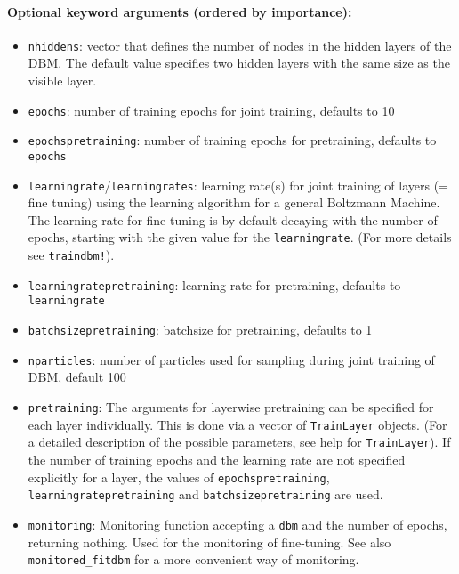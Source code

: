 \paragraph*{Optional keyword arguments (ordered by importance):}
\begin{itemize}
\item \texttt{nhiddens}: vector that defines the number of nodes in the hidden layers of  the DBM. The default value specifies two hidden layers with the same size  as the visible layer.


\item \texttt{epochs}: number of training epochs for joint training, defaults to 10


\item \texttt{epochspretraining}: number of training epochs for pretraining,  defaults to \texttt{epochs}


\item \texttt{learningrate}\slash \texttt{learningrates}:  learning rate(s) for joint training of layers (= fine tuning)  using the learning algorithm for a general Boltzmann Machine.  The learning rate for fine tuning is by default decaying with the number of epochs,  starting with the given value for the \texttt{learningrate}.  (For more details see \texttt{traindbm!}).


\item \texttt{learningratepretraining}: learning rate for pretraining,  defaults to \texttt{learningrate}


\item \texttt{batchsizepretraining}: batchsize for pretraining, defaults to 1


\item \texttt{nparticles}: number of particles used for sampling during joint training of  DBM, default 100


\item \texttt{pretraining}: The arguments for layerwise pretraining  can be specified for each layer individually.  This is done via a vector of \texttt{TrainLayer} objects.  (For a detailed description of the possible parameters,  see help for \texttt{TrainLayer}).  If the number of training epochs and the learning rate are not specified  explicitly for a layer, the values of \texttt{epochspretraining},  \texttt{learningratepretraining} and \texttt{batchsizepretraining} are used.


\item \texttt{monitoring}: Monitoring function accepting a \texttt{dbm} and the number of epochs,  returning nothing. Used for the monitoring of fine-tuning.  See also \texttt{monitored\_fitdbm} for a more convenient way of monitoring.



\end{itemize}
